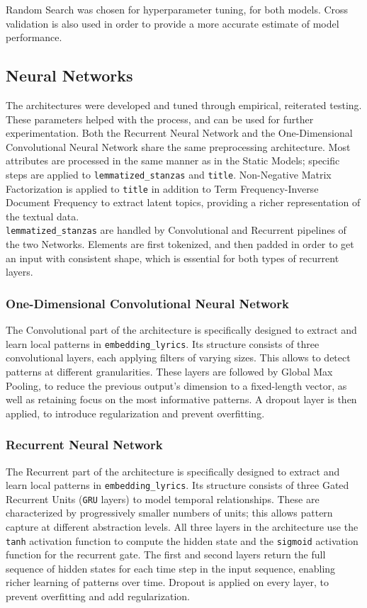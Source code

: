Random Search was chosen for hyperparameter tuning, for both models.
Cross validation is also used in order to provide a more accurate
estimate of model performance.

\subsection*{Neural Networks}
The architectures were developed and tuned through empirical,
reiterated testing. These parameters helped with the process, and can
be used for further experimentation.
Both the Recurrent Neural Network and the One-Dimensional Convolutional
Neural Network share the same preprocessing
architecture. Most attributes are processed in the same manner as in
the Static Models; specific steps are applied to \texttt{lemmatized\_stanzas}
and \texttt{title}.
Non-Negative Matrix Factorization is applied to \texttt{title} in addition to
Term Frequency-Inverse Document Frequency
to extract latent topics, providing a richer representation of the
textual data.\\

\texttt{lemmatized\_stanzas} are handled by Convolutional and Recurrent
pipelines of the two Networks.
Elements are first tokenized, and then padded in order to
get an input with consistent shape, which is essential for both types of
recurrent layers.

\subsubsection*{One-Dimensional Convolutional Neural Network}
The Convolutional part of the architecture is specifically designed to extract and learn
local patterns in \texttt{embedding\_lyrics}.
Its structure consists of three convolutional layers, each applying filters of
varying sizes. This allows to detect patterns at different granularities.
These layers are followed by Global Max Pooling, to reduce the previous output's
dimension to a fixed-length vector, as well as retaining focus on the most
informative patterns.
A dropout layer is then applied, to introduce regularization and prevent
overfitting.

\subsubsection*{Recurrent Neural Network}
The Recurrent part of the architecture is specifically designed to extract and learn
local patterns in \texttt{embedding\_lyrics}.
Its structure consists of three Gated Recurrent Units (\texttt{GRU} layers)
to model temporal relationships. These are characterized by progressively smaller
numbers of units; this allows pattern capture at different abstraction levels.
All three layers in the architecture use the \texttt{tanh} activation function
to compute the hidden state and
the \texttt{sigmoid} activation function for the recurrent gate.
The first and second layers return the full sequence of hidden states for each
time step in the input sequence, enabling richer learning of patterns over time.
Dropout is applied on every layer, to prevent overfitting and add regularization.

